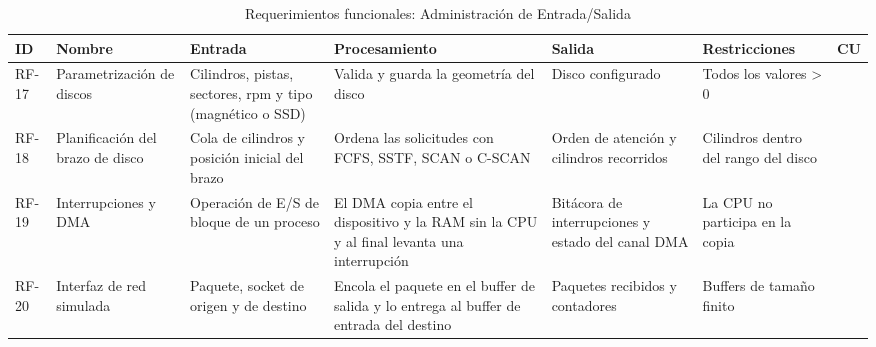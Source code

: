 \documentclass[conference]{IEEEtran}
\begin{document}
\begin{table}[!t]
\caption{Requerimientos funcionales: Administración de Entrada/Salida}
\label{tab:rf-es}
\footnotesize\renewcommand{\arraystretch}{1.1}\setlength{\tabcolsep}{2pt}
\begin{tabular}{|>{\raggedright\arraybackslash}p{0.95cm}|>{\raggedright\arraybackslash}p{2.3cm}|>{\raggedright\arraybackslash}p{3.2cm}|>{\raggedright\arraybackslash}p{3.9cm}|>{\raggedright\arraybackslash}p{2.8cm}|>{\raggedright\arraybackslash}p{2.8cm}|>{\raggedright\arraybackslash}p{0.95cm}|}
\hline
\textbf{ID} & \textbf{Nombre} & \textbf{Entrada} & \textbf{Procesamiento} & \textbf{Salida} & \textbf{Restricciones} & \textbf{CU}\\ \hline
RF-17 & Parametrización de discos & Cilindros, pistas, sectores, rpm y tipo (magnético o SSD) & Valida y guarda la geometría del disco & Disco configurado & Todos los valores > 0 & 09\\ \hline
RF-18 & Planificación del brazo de disco & Cola de cilindros y posición inicial del brazo & Ordena las solicitudes con FCFS, SSTF, SCAN o C-SCAN & Orden de atención y cilindros recorridos & Cilindros dentro del rango del disco & 09\\ \hline
RF-19 & Interrupciones y DMA & Operación de E/S de bloque de un proceso & El DMA copia entre el dispositivo y la RAM sin la CPU y al final levanta una interrupción & Bitácora de interrupciones y estado del canal DMA & La CPU no participa en la copia & 10\\ \hline
RF-20 & Interfaz de red simulada & Paquete, socket de origen y de destino & Encola el paquete en el buffer de salida y lo entrega al buffer de entrada del destino & Paquetes recibidos y contadores & Buffers de tamaño finito & 11\\ \hline
\end{tabular}
\end{table}
\end{document}

